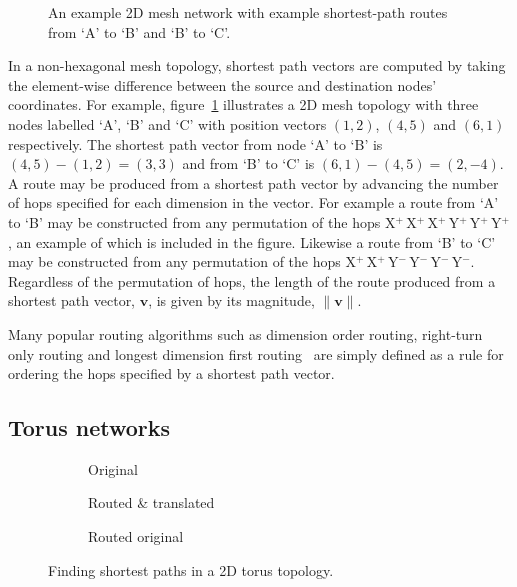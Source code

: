 		\begin{figure}
			\center
			\caption[Shortest path routes in a 2D mesh network.]%
			{An example 2D mesh network with example shortest-path routes
			from `A' to `B' and `B' to `C'.}
			\label{fig:mesh-topology-coordinates}
		\end{figure}
		
		In a non-hexagonal mesh topology, shortest path vectors are computed by
		taking the element-wise difference between the source and destination
		nodes' coordinates. For example, figure~\ref{fig:mesh-topology-coordinates}
		illustrates a 2D mesh topology with three nodes labelled `A', `B' and `C'
		with position vectors $(1, 2)$, $(4, 5)$ and $(6, 1)$ respectively. The
		shortest path vector from node `A' to `B' is $(4, 5) - (1, 2) = (3, 3)$ and
		from `B' to `C' is $(6, 1) - (4, 5) = (2, -4)$. A route may be produced
		from a shortest path vector by advancing the number of hops specified for
		each dimension in the vector.  For example a route from `A' to `B' may be
		constructed from any permutation of the hops
		X$^+\,$X$^+\,$X$^+\,$Y$^+\,$Y$^+\,$Y$^+$, an example of which is included
		in the figure. Likewise a route from `B' to `C' may be constructed from any
		permutation of the hops X$^+\,$X$^+\,$Y$^-\,$Y$^-\,$Y$^-\,$Y$^-$.
		Regardless of the permutation of hops, the length of the route produced
		from a shortest path vector, $\mathbf{v}$, is given by its magnitude,
		$\|\mathbf{v}\|$.
		
		Many popular routing algorithms such as dimension order routing, right-turn
		only routing and longest dimension first routing~\cite{davies12} are simply
		defined as a rule for ordering the hops specified by a shortest path
		vector.
		
		\subsection{Torus networks}
			
			\begin{figure}
				\center
				\begin{subfigure}{0.3\linewidth}
					\center
					\caption{Original}
					\label{fig:torus-shortest-path-example}
				\end{subfigure}
				\begin{subfigure}{0.3\linewidth}
					\center
					\caption{Routed \& translated}
					\label{fig:torus-shortest-path-translate}
				\end{subfigure}
				\begin{subfigure}{0.3\linewidth}
					\center
					\caption{Routed original}
					\label{fig:torus-shortest-path-routed}
				\end{subfigure}
				
				\caption{Finding shortest paths in a 2D torus topology.}
				\label{fig:torus-shortest-path}
			\end{figure}
			
